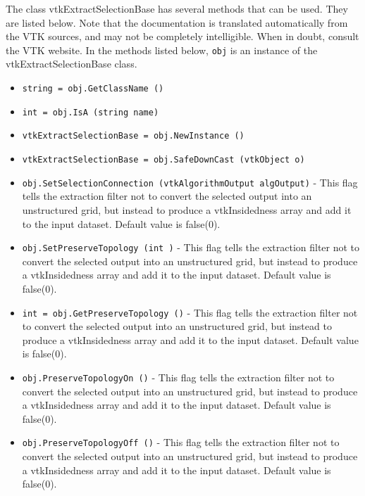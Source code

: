 The class vtkExtractSelectionBase has several methods that can be used.
  They are listed below.
Note that the documentation is translated automatically from the VTK sources,
and may not be completely intelligible.  When in doubt, consult the VTK website.
In the methods listed below, \verb|obj| is an instance of the vtkExtractSelectionBase class.
\begin{itemize}
\item  \verb|string = obj.GetClassName ()|

\item  \verb|int = obj.IsA (string name)|

\item  \verb|vtkExtractSelectionBase = obj.NewInstance ()|

\item  \verb|vtkExtractSelectionBase = obj.SafeDownCast (vtkObject o)|

\item  \verb|obj.SetSelectionConnection (vtkAlgorithmOutput algOutput)| -  This flag tells the extraction filter not to convert the selected
 output into an unstructured grid, but instead to produce a vtkInsidedness
 array and add it to the input dataset. Default value is false(0).

\item  \verb|obj.SetPreserveTopology (int )| -  This flag tells the extraction filter not to convert the selected
 output into an unstructured grid, but instead to produce a vtkInsidedness
 array and add it to the input dataset. Default value is false(0).

\item  \verb|int = obj.GetPreserveTopology ()| -  This flag tells the extraction filter not to convert the selected
 output into an unstructured grid, but instead to produce a vtkInsidedness
 array and add it to the input dataset. Default value is false(0).

\item  \verb|obj.PreserveTopologyOn ()| -  This flag tells the extraction filter not to convert the selected
 output into an unstructured grid, but instead to produce a vtkInsidedness
 array and add it to the input dataset. Default value is false(0).

\item  \verb|obj.PreserveTopologyOff ()| -  This flag tells the extraction filter not to convert the selected
 output into an unstructured grid, but instead to produce a vtkInsidedness
 array and add it to the input dataset. Default value is false(0).

\end{itemize}
